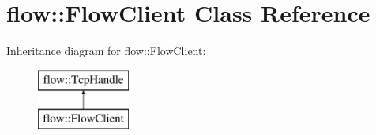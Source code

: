 \hypertarget{classflow_1_1_flow_client}{}\section{flow\+:\+:Flow\+Client Class Reference}
\label{classflow_1_1_flow_client}
Inheritance diagram for flow\+:\+:Flow\+Client\+:\begin{figure}[H]
\begin{center}
\leavevmode
\includegraphics[height=2.000000cm]{classflow_1_1_flow_client}
\end{center}
\end{figure}
